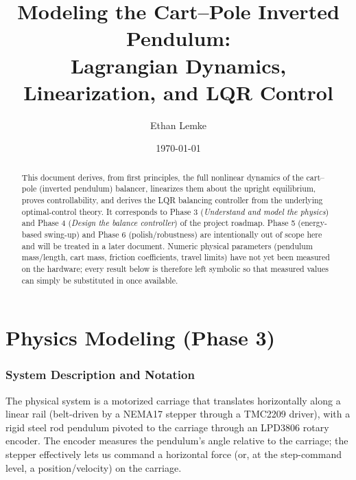 \documentclass[11pt]{article}
\title{Modeling the Cart--Pole Inverted Pendulum:\\
Lagrangian Dynamics, Linearization, and LQR Control}
\author{Ethan Lemke}
\date{\today}
\begin{document}
\maketitle

\begin{abstract}
This document derives, from first principles, the full nonlinear dynamics of
the cart--pole (inverted pendulum) balancer, linearizes them about the
upright equilibrium, proves controllability, and derives the LQR balancing
controller from the underlying optimal-control theory. It corresponds to
Phase 3 (\emph{Understand and model the physics}) and Phase 4
(\emph{Design the balance controller}) of the project roadmap. Phase 5
(energy-based swing-up) and Phase 6 (polish/robustness) are intentionally
out of scope here and will be treated in a later document. Numeric physical
parameters (pendulum mass/length, cart mass, friction coefficients, travel
limits) have not yet been measured on the hardware; every result below is
therefore left symbolic so that measured values can simply be substituted
in once available.
\end{abstract}

\tableofcontents

\part{Physics Modeling (Phase 3)}

\section{System Description and Notation}

The physical system is a motorized carriage that translates horizontally
along a linear rail (belt-driven by a NEMA17 stepper through a TMC2209
driver), with a rigid steel rod pendulum pivoted to the carriage through an
LPD3806 rotary encoder. The encoder measures the pendulum's angle relative
to the carriage; the stepper effectively lets us command a horizontal force
(or, at the step-command level, a position/velocity) on the carriage.
\end{document}
